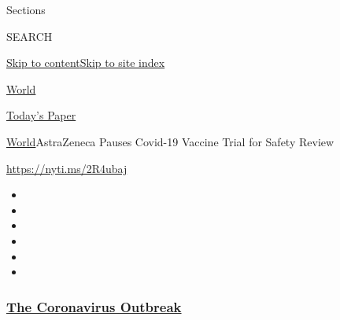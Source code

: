 Sections

SEARCH

\protect\hyperlink{site-content}{Skip to
content}\protect\hyperlink{site-index}{Skip to site index}

\href{https://www.nytimes3xbfgragh.onion/section/world}{World}

\href{https://myaccount.nytimes3xbfgragh.onion/auth/login?response_type=cookie\&client_id=vi}{}

\href{https://www.nytimes3xbfgragh.onion/section/todayspaper}{Today's
Paper}

\href{/section/world}{World}\textbar{}AstraZeneca Pauses Covid-19
Vaccine Trial for Safety Review

\url{https://nyti.ms/2R4ubaj}

\begin{itemize}
\item
\item
\item
\item
\item
\item
\end{itemize}

\hypertarget{the-coronavirus-outbreak}{%
\subsubsection{\texorpdfstring{\href{https://www.nytimes3xbfgragh.onion/news-event/coronavirus?name=styln-coronavirus-national\&region=TOP_BANNER\&block=storyline_menu_recirc\&action=click\&pgtype=Article\&impression_id=ec74b410-f278-11ea-8a8c-b5a05ac83e51\&variant=undefined}{The
Coronavirus
Outbreak}}{The Coronavirus Outbreak}}\label{the-coronavirus-outbreak}}

